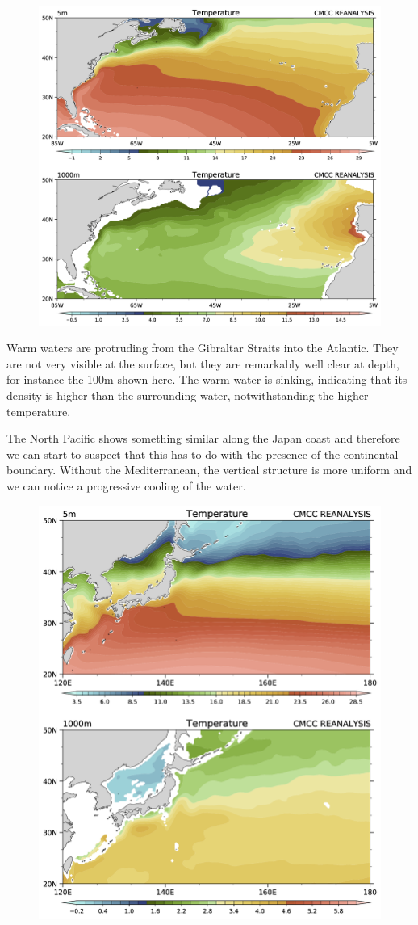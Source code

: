 \begin{figure}
	\centering
	\includegraphics[width = .7 \textwidth]{figs/GD/Gulf1000.png}
	\caption{} \label{fig:}
\end{figure}

Warm waters are protruding from the Gibraltar Straits into the Atlantic.
They are not very visible at the surface, but they are remarkably well
clear at depth, for instance the 100m shown here. The warm water is
sinking, indicating that its density is higher than the surrounding
water, notwithstanding the higher temperature.

The North Pacific shows something similar along the Japan coast and
therefore we can start to suspect that this has to do with the presence
of the continental boundary. Without the Mediterranean, the vertical
structure is more uniform and we can notice a progressive cooling of the
water.

\begin{figure}
	\centering
	\includegraphics[width = .7 \textwidth]{figs/GD/Kur1000.png}
	\caption{} \label{fig:}
\end{figure}

